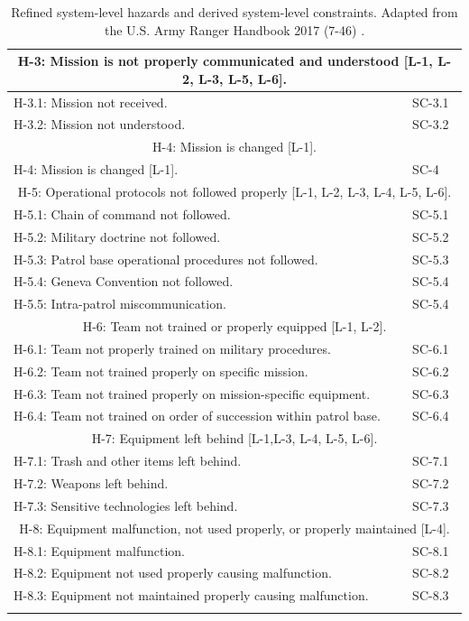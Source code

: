 \documentclass[../../main/main.tex]{subfiles}
\begin{document}
\begin{longtable}[h]{ | m{7.5cm} |  m{7.5cm} | }
\hline
\multicolumn{2}{|c|}{H-3: Mission is not properly communicated and understood [L-1, L-2, L-3, L-5, L-6].}\\
\hline
H-3.1: Mission not received.
& 
SC-3.1 \\
\hline
H-3.2: Mission not understood.
& 
SC-3.2 \\

\hline
\multicolumn{2}{|c|}{H-4: Mission is changed [L-1].}\\
\hline
H-4: Mission is changed [L-1].
& 
SC-4\\

\hline
\multicolumn{2}{|c|}{H-5: Operational protocols not followed properly [L-1, L-2, L-3, L-4, L-5, L-6].}\\
\hline
 H-5.1: Chain of command not followed.
 & 
SC-5.1\\
\hline
H-5.2: Military doctrine not followed.
 & 
SC-5.2\\
\hline
H-5.3: Patrol base operational procedures not followed.
 & 
SC-5.3\\
\hline
H-5.4: Geneva Convention not followed.
 & 
SC-5.4\\
\hline
H-5.5: Intra-patrol miscommunication.
 & 
SC-5.4\\

\hline
\multicolumn{2}{|c|}{H-6: Team not trained or properly equipped [L-1, L-2].}\\
\hline
H-6.1: Team not properly trained on military procedures.
 & 
SC-6.1\\
\hline
H-6.2: Team not trained properly on specific mission.
 & 
SC-6.2\\
\hline
H-6.3: Team not trained properly on mission-specific equipment.
 & 
SC-6.3\\
\hline
H-6.4: Team not trained on order of succession within patrol base.
 & 
SC-6.4\\

\hline
\multicolumn{2}{|c|}{H-7: Equipment left behind [L-1,L-3, L-4, L-5, L-6].}\\
\hline
H-7.1: Trash and other items left behind.
 & 
SC-7.1\\
\hline
H-7.2: Weapons left behind.
 & 
SC-7.2\\
\hline
H-7.3: Sensitive technologies left behind.
 & 
SC-7.3\\

\hline
\multicolumn{2}{|c|}{H-8: Equipment malfunction, not used properly, or properly maintained [L-4].}\\
\hline
H-8.1: Equipment malfunction.
 & 
SC-8.1\\
\hline
H-8.2: Equipment not used properly causing malfunction.
 & 
SC-8.2\\
\hline
H-8.3: Equipment not maintained properly causing malfunction.
 & 
SC-8.3\\
\hline

\caption{Refined system-level hazards and derived system-level constraints.  Adapted from the U.S. Army Ranger Handbook 2017 (7-46) \cite{rangermanual}\label{slconstraints}.}\\

\end{longtable}
\parskip=18pt
\end{document}
